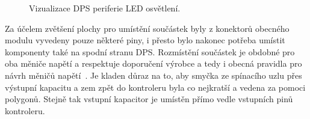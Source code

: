    \begin{figure}[!ht]
        \centering
        \caption{Vizualizace DPS periferie LED osvětlení.}
        \label{fig:perif-led-dps}
    \end{figure}

    Za účelem zvětšení plochy pro umístění součástek byly z konektorů obecného modulu vyvedeny pouze některé piny, i přesto bylo nakonec potřeba umístit komponenty také na spodní stranu DPS. Rozmístění součástek je obdobné pro oba měniče napětí a respektuje doporučení výrobce a tedy i obecná pravidla pro návrh měničů napětí~\cite{Diodes_AP63356Q}. Je kladen důraz na to, aby smyčka ze spínacího uzlu přes výstupní kapacitu a zem zpět do kontroleru byla co nejkratší a vedena za pomoci polygonů. Stejně tak vstupní kapacitor je umístěn přímo vedle vstupních pinů kontroleru.